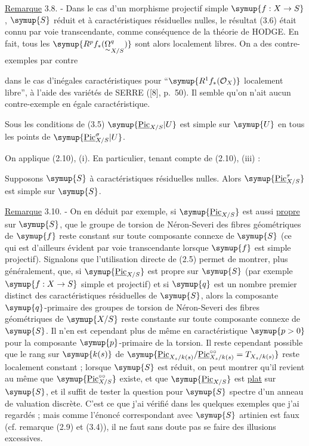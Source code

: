 \noindent\uline{Remarque} 3.8. - Dans le cas d'un morphisme projectif simple
$\symup{f:X\to S}$, $\symup{S}$ réduit et à caractéristiques résiduelles nulles,
le résultat (3.6) était connu par voie transcendante, comme conséquence de la
théorie de HODGE. En fait, tous les $\symup{R^pf_*(\mathord{\underset{\sim}{\Omega}}^q_{X/S})}$ sont alors
localement libres. On a des contre-exemples par contre

dans le cas d'inégales caractéristiques pour ``$\symup{R^1f_*(\mathcal O_X)}$
localement libre'', à l'aide des variétés de SERRE ([8], p.~50). Il semble
qu'on n'ait aucun contre-exemple en égale caractéristique.

 Sous les conditions de (3.5)
$\symup{\underline{\operatorname{Pic}}_{X/S}|U}$ est simple sur $\symup{U}$ en tous les points de
$\symup{\underline{\operatorname{Pic}}_{X/S}^\sigma|U}$.

On applique (2.10), (i). En particulier, tenant compte de (2.10), (iii) :

 Supposons $\symup{S}$ à caractéristiques résiduelles nulles.
Alors $\symup{\underline{\operatorname{Pic}}_{X/S}^\tau}$ est simple sur $\symup{S}$.

\noindent\uline{Remarque} 3.10. - On en déduit par exemple, si $\symup{\underline{\operatorname{Pic}}_{X/S}}$ est aussi \uline{propre} sur $\symup{S}$, que le groupe de torsion
de Néron-Severi des fibres géométriques de $\symup{f}$ reste constant sur toute
composante connexe de $\symup{S}$ (ce qui est d'ailleurs évident par voie transcendante
lorsque $\symup{f}$ est simple projectif). Signalons que l'utilisation directe de (2.5) permet de montrer, plus généralement, que, si $\symup{\underline{\operatorname{Pic}}_{X/S}}$ est propre sur $\symup{S}$ (par exemple $\symup{f:X\to S}$ simple et projectif) et si $\symup{q}$ est un nombre premier
distinct des caractéristiques résiduelles de $\symup{S}$, alors la composante
$\symup{q}$-primaire des groupes de torsion de Néron-Severi des fibres géométriques de
$\symup{X/S}$ reste constante sur toute composante connexe de $\symup{S}$. Il n'en est
cependant plus de même en caractéristique $\symup{p>0}$ pour la composante $\symup{p}$-primaire
de la torsion. Il reste cependant possible que le rang sur $\symup{k(s)}$ de $\symup{\underline{\operatorname{Pic}}_{X_s/k(s)}/\underline{\operatorname{Pic}}_{X_s/k(s)}^{\circ\circ}=T_{X_s/k(s)}}$ reste localement constant ; lorsque $\symup{S}$ est réduit, on peut montrer qu'il
revient au même que $\symup{\underline{\operatorname{Pic}}_{X/S}^{\circ\circ}}$ existe, et que
$\symup{\underline{\operatorname{Pic}}_{X/S}}$ est \uline{plat} sur $\symup{S}$, et il suffit de tester la
question pour $\symup{S}$ spectre d'un anneau de valuation discrète. C'est ce que j'ai
vérifié dans les quelques exemples que j'ai regardés ; mais comme l'énoncé
correspondant avec $\symup{S}$ artinien est faux (cf. remarque (2.9) et (3.4)), il ne
faut sans doute pas se faire des illusions excessives.

